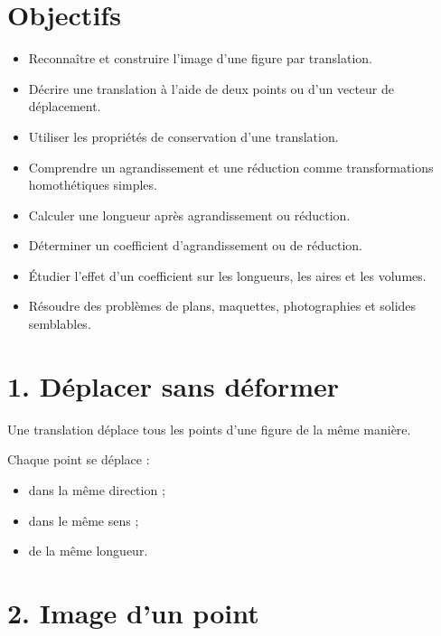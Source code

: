 
\section{Objectifs}

\begin{itemize}
\item Reconnaître et construire l'image d'une figure par translation.
\item Décrire une translation à l'aide de deux points ou d'un vecteur de déplacement.
\item Utiliser les propriétés de conservation d'une translation.
\item Comprendre un agrandissement et une réduction comme transformations homothétiques simples.
\item Calculer une longueur après agrandissement ou réduction.
\item Déterminer un coefficient d'agrandissement ou de réduction.
\item Étudier l'effet d'un coefficient sur les longueurs, les aires et les volumes.
\item Résoudre des problèmes de plans, maquettes, photographies et solides semblables.
\end{itemize}

\section{1. Déplacer sans déformer}

Une translation déplace tous les points d'une figure de la même manière.

Chaque point se déplace :
\begin{itemize}
\item dans la même direction ;
\item dans le même sens ;
\item de la même longueur.
\end{itemize}


\section{2. Image d'un point}

